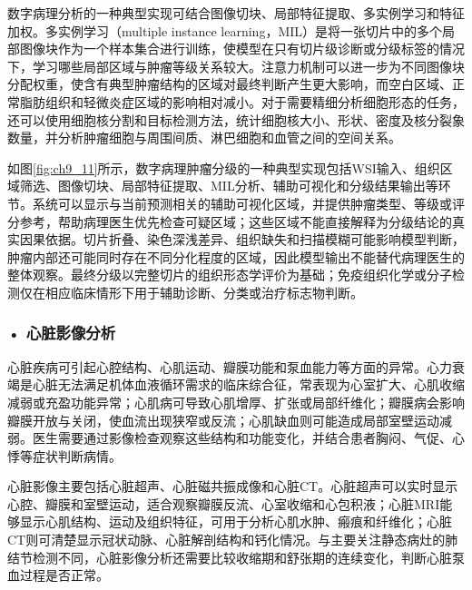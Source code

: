 数字病理分析的一种典型实现可结合图像切块、局部特征提取、多实例学习和特征加权。多实例学习（multiple instance learning，MIL）是将一张切片中的多个局部图像块作为一个样本集合进行训练，使模型在只有切片级诊断或分级标签的情况下，学习哪些局部区域与肿瘤等级关系较大。注意力机制可以进一步为不同图像块分配权重，使含有典型肿瘤结构的区域对最终判断产生更大影响，而空白区域、正常脂肪组织和轻微炎症区域的影响相对减小。对于需要精细分析细胞形态的任务，还可以使用细胞核分割和目标检测方法，统计细胞核大小、形状、密度及核分裂象数量，并分析肿瘤细胞与周围间质、淋巴细胞和血管之间的空间关系。

如图\ref{fig:ch9_11}所示，数字病理肿瘤分级的一种典型实现包括WSI输入、组织区域筛选、图像切块、局部特征提取、MIL分析、辅助可视化和分级结果输出等环节。系统可以显示与当前预测相关的辅助可视化区域，并提供肿瘤类型、等级或评分参考，帮助病理医生优先检查可疑区域；这些区域不能直接解释为分级结论的真实因果依据。切片折叠、染色深浅差异、组织缺失和扫描模糊可能影响模型判断，肿瘤内部还可能同时存在不同分化程度的区域，因此模型输出不能替代病理医生的整体观察。最终分级以完整切片的组织形态学评价为基础；免疫组织化学或分子检测仅在相应临床情形下用于辅助诊断、分类或治疗标志物判断。

\par
\noindent\begin{minipage}{\textwidth}
\centering
{}
\label{fig:ch9_11}
\end{minipage}
\par


\subsubsection*{\textbf{• 心脏影像分析}}

心脏疾病可引起心腔结构、心肌运动、瓣膜功能和泵血能力等方面的异常。心力衰竭是心脏无法满足机体血液循环需求的临床综合征，常表现为心室扩大、心肌收缩减弱或充盈功能异常；心肌病可导致心肌增厚、扩张或局部纤维化；瓣膜病会影响瓣膜开放与关闭，使血流出现狭窄或反流；心肌缺血则可能造成局部室壁运动减弱。医生需要通过影像检查观察这些结构和功能变化，并结合患者胸闷、气促、心悸等症状判断病情。

心脏影像主要包括心脏超声、心脏磁共振成像和心脏CT。心脏超声可以实时显示心腔、瓣膜和室壁运动，适合观察瓣膜反流、心室收缩和心包积液；心脏MRI能够显示心肌结构、运动及组织特征，可用于分析心肌水肿、瘢痕和纤维化；心脏CT则可清楚显示冠状动脉、心脏解剖结构和钙化情况。与主要关注静态病灶的肺结节检测不同，心脏影像分析还需要比较收缩期和舒张期的连续变化，判断心脏泵血过程是否正常。

